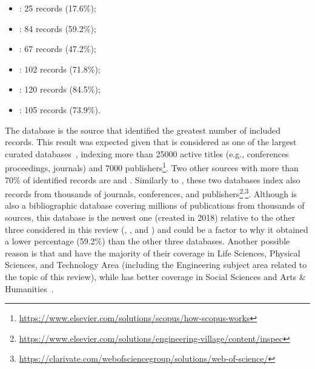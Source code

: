\begin{itemize}[nosep]
\item {}: 25 records (17.6\%);
\item {}: 84 records (59.2\%);
\item {}: 67 records (47.2\%);
\item {}: 102 records (71.8\%);
\item {}: 120 records (84.5\%);
\item {}: 105 records (73.9\%).
\end{itemize}

The database  is the source that identified the greatest number of included records. This result was expected given that  is considered as one of the largest curated databases~\parencite{methodology:search:db:coverage:dim-scopus-wos}, indexing more than 25000 active titles (e.g., conferences proceedings, journals) and 7000 publishers\footnote{\url{https://www.elsevier.com/solutions/scopus/how-scopus-works}}.
Two other sources with more than 70\% of identified records are  and . Similarly to , these two databases index also records from thousands of journals, conferences, and publishers\footnote{\url{https://www.elsevier.com/solutions/engineering-village/content/inspec}}\textsuperscript{,}\footnote{\url{https://clarivate.com/webofsciencegroup/solutions/web-of-science/}}.
Although  is also a bibliographic database covering millions of publications from thousands of sources, this database is the newest one (created in 2018) relative to the other three considered in this review (, , and ) and could be a factor to why it obtained a lower percentage (59.2\%) than the other three databases. Another possible reason is that  and  have the majority of their coverage in Life Sciences, Physical Sciences, and Technology Area (including the Engineering subject area related to the topic of this review), while  has better coverage in Social Sciences and Arts \& Humanities~\parencite{methodology:search:db:coverage:dim-scopus-wos}.
